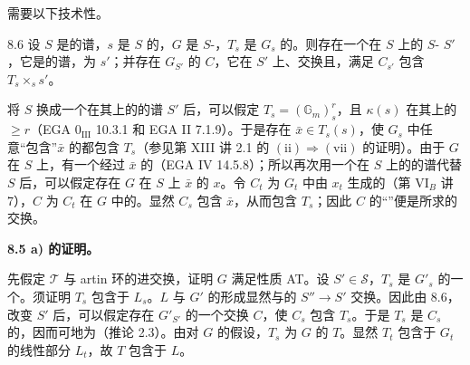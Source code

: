 需要以下技术性。
\begin{SGAresult}{}{8.6}
设 $S$ 是的谱，$s$ 是 $S$ 的，$G$ 是 $S$-，$T_s$ 是 $G_s$ 的。则存在一个在 $S$ 上的 $S$- $S'$，它是的谱，为 $s'$；并存在 $G_{S'}$ 的 $C$，它在 $S'$ 上、交换且，满足 $C_{s'}$ 包含 $T_s\times_s s'$。
\end{SGAresult}
将 $S$ 换成一个在其上的的谱 $S'$ 后，可以假定 $T_s=(\mathbb G_m)^r_s$，且 $\kappa(s)$ 在其上的 $\geq r$（EGA $0_{\mathrm{III}}$ 10.3.1 和 EGA II 7.1.9）。于是存在 $\bar x\in T_s(s)$，使 $G_s$ 中任意“包含”$\bar x$ 的都包含 $T_s$（参见第 XIII 讲 2.1 的 $\mathrm{(ii)}\Rightarrow\mathrm{(vii)}$ 的证明）。由于 $G$ 在 $S$ 上，有一个经过 $\bar x$ 的（EGA IV 14.5.8）；所以再次用一个在 $S$ 上的的谱代替 $S$ 后，可以假定存在 $G$ 在 $S$ 上 $\bar x$ 的 $x$。令 $C_t$ 为 $G_t$ 中由 $x_t$ 生成的（第 VI$_B$ 讲 7），$C$ 为 $C_t$ 在 $G$ 中的。显然 $C_s$ 包含 $\bar x$，从而包含 $T_s$；因此 $C$ 的“”便是所求的交换。

\textbf{8.5 a) 的证明。}

先假定 $\mathcal T$ 与 artin 环的进交换，证明 $G$ 满足性质 AT。设 $S'\in\mathscr S$，$T_s$ 是 $G'_s$ 的一个。须证明 $T_s$ 包含于 $L_s$。$L$ 与 $G'$ 的形成显然与的 $S''\to S'$ 交换。因此由 8.6，改变 $S'$ 后，可以假定存在 $G'_{S'}$ 的一个交换 $C$，使 $C_s$ 包含 $T_s$。于是 $T_s$ 是 $C_s$ 的，因而可地为（推论 2.3）。由对 $G$ 的假设，$T_s$ 为 $G$ 的 $T$。显然 $T_t$ 包含于 $G_t$ 的线性部分 $L_t$，故 $T$ 包含于 $L$。

